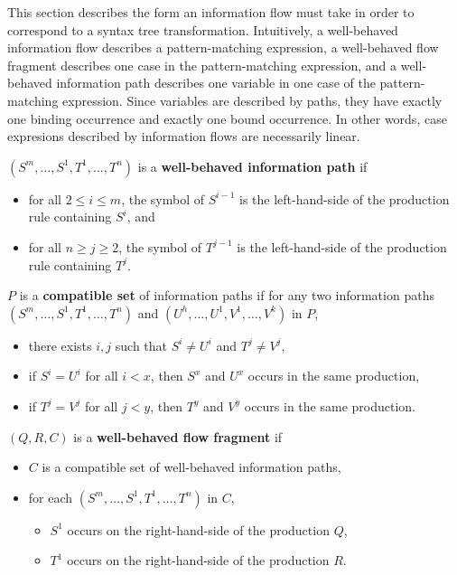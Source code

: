 \documentclass{amsart}
\begin{document}
This section describes the form an information flow must take in
order to correspond to a syntax tree transformation. Intuitively,
a well-behaved information flow describes a pattern-matching
expression, a well-behaved flow fragment describes one case in
the pattern-matching expression, and a well-behaved information
path describes one variable in one case of the pattern-matching
expression. Since variables are described by paths, they have
exactly one binding occurrence and exactly one bound occurrence.
In other words, case expresions described by information flows
are necessarily linear.

\bigbreak

$(S^m,\ldots,S^1,T^1,\ldots,T^n)$ is a \textbf{well-behaved
information path} if
\begin{itemize}
\item for all $2\le i\le m$, the symbol of $S^{i-1}$ is the
left-hand-side of the production rule containing $S^i$, and
\item for all $n\ge j\ge 2$, the symbol of $T^{j-1}$ is the
left-hand-side of the production rule containing $T^j$.
\end{itemize}

\bigbreak

$P$ is a \textbf{compatible set} of information paths if for any
two information paths $(S^m,\ldots,S^1,T^1,\ldots,T^n)$ and
$(U^h,\ldots,U^1,V^1,\ldots,V^k)$ in $P$,
\begin{itemize}
\item there exists $i,j$ such that $S^i\neq U^i$ and $T^j\neq
V^j$,
\item if $S^i=U^i$ for all $i<x$, then $S^x$ and $U^x$ occurs in
the same production,
\item if $T^j=V^j$ for all $j<y$, then $T^y$ and $V^y$ occurs in
the same production.
\end{itemize}

\bigbreak

$(Q,R,C)$ is a \textbf{well-behaved flow fragment} if
\begin{itemize}
\item $C$ is a compatible set of well-behaved information paths,
\item for each $(S^m,\ldots,S^1,T^1,\ldots,T^n)$ in $C$,
\begin{itemize}
\item $S^1$ occurs on the right-hand-side of the production $Q$,
\item $T^1$ occurs on the right-hand-side of the production $R$.
\end{itemize}
\end{itemize}
\end{document}
